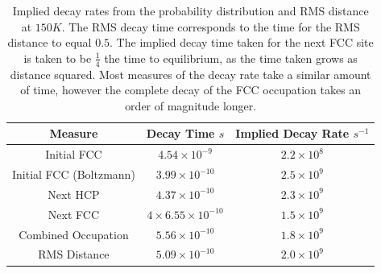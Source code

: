 \begin{table}[htbp]
    \begin{center}
        \begin{tabular}{ *{3}{c} }
            \toprule
            Measure                 & Decay Time \(s\)                   & Implied Decay Rate \(s^{-1}\) \\
            \midrule
            Initial FCC             & \(4.54\times{}10^{-9}\)            & \(2.2\times{}10^{8}\)         \\
            Initial FCC (Boltzmann) & \(3.99\times{}10^{-10}\)           & \(2.5\times{}10^{9}\)         \\
            Next HCP                & \(4.37\times{}10^{-10}\)           & \(2.3\times{}10^{9}\)         \\
            Next FCC                & \(4\times{}6.55 \times{}10^{-10}\) & \(1.5\times{}10^{9}\)         \\
            Combined Occupation     & \(5.56\times{}10^{-10}\)           & \(1.8\times{}10^{9}\)         \\
            RMS Distance            & \(5.09\times{}10^{-10}\)           & \(2.0 \times 10^{9}\)         \\
            \bottomrule
        \end{tabular}
    \end{center}
    \caption{Implied decay rates
        from the probability
        distribution and RMS distance
        at \(150K\).
        The RMS decay time corresponds
        to the time for the RMS distance
        to equal \(0.5\).
        The implied decay time taken for
        the next FCC site is taken to
        be \(\frac{1}{4}\) the time to
        equilibrium, as the time
        taken grows as distance
        squared.
        Most measures
        of the decay rate take a similar
        amount of time, however the
        complete decay of the FCC
        occupation takes an order of
        magnitude longer.
    }\label{tab:implied decay rates}
\end{table}

